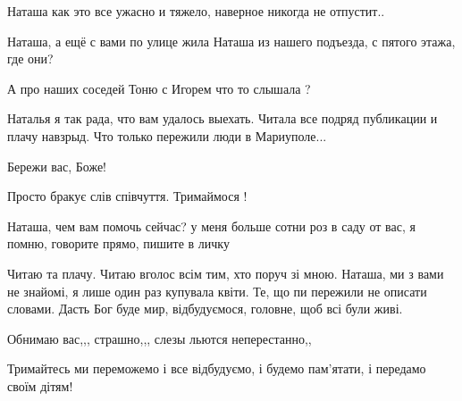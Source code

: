 
 
 
 
 

\qqSecCmt


Наташа как это все ужасно и тяжело, наверное никогда не отпустит..


Наташа, а ещё с вами по улице жила Наташа из нашего подъезда, с пятого этажа, где они?


А про наших соседей Тоню с Игорем что то слышала ?


Наталья я так рада, что вам удалось выехать. Читала все подряд публикации и
плачу навзрыд. Что только пережили люди в Мариуполе...


Бережи вас, Боже!


Просто бракує слів співчуття. Тримаймося !


Наташа, чем вам помочь сейчас? у меня больше сотни роз в саду от вас, я помню, говорите прямо, пишите в личку


Читаю та плачу. Читаю вголос всім тим, хто поруч зі мною. Наташа, ми з вами не
знайомі, я лише один раз купувала квіти. Те, що пи пережили не описати словами.
Дасть Бог буде мир, відбудуємося, головне, щоб всі були живі.


Обнимаю вас,,, страшно,,, слезы льются неперестанно,,


Тримайтесь ми переможемо і все відбудуємо, і будемо пам'ятати, і передамо своїм дітям!
